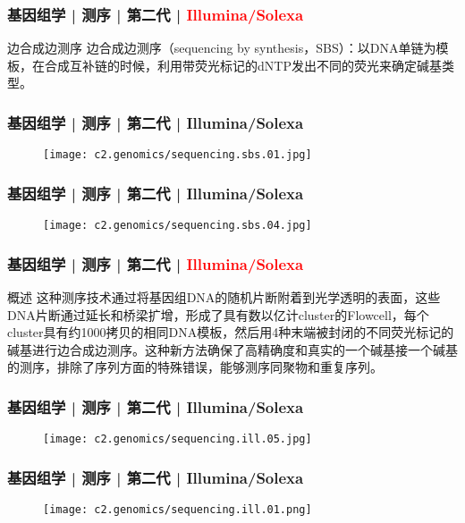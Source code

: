 \begin{frame}
  \frametitle{基因组学 | 测序 | 第二代 | \textcolor{red}{Illumina/Solexa}}
  \begin{block}{边合成边测序}
边合成边测序（sequencing by synthesis，SBS）：以DNA单链为模板，在合成互补链的时候，利用带荧光标记的dNTP发出不同的荧光来确定碱基类型。
  \end{block}
\end{frame}

\begin{frame}
  \frametitle{基因组学 | 测序 | 第二代 | Illumina/Solexa}
  \begin{figure}
    \centering
    \texttt{[image: c2.genomics/sequencing.sbs.01.jpg]}
  \end{figure}
\end{frame}

\begin{frame}
  \frametitle{基因组学 | 测序 | 第二代 | Illumina/Solexa}
  \begin{figure}
    \centering
    \texttt{[image: c2.genomics/sequencing.sbs.04.jpg]}
  \end{figure}
\end{frame}

\begin{frame}
  \frametitle{基因组学 | 测序 | 第二代 | \textcolor{red}{Illumina/Solexa}}
  \begin{block}{概述}
这种测序技术通过将基因组DNA的随机片断附着到光学透明的表面，这些DNA片断通过延长和桥梁扩增，形成了具有数以亿计cluster的Flowcell，每个cluster具有约1000拷贝的相同DNA模板，然后用4种末端被封闭的不同荧光标记的碱基进行边合成边测序。这种新方法确保了高精确度和真实的一个碱基接一个碱基的测序，排除了序列方面的特殊错误，能够测序同聚物和重复序列。
  \end{block}
\end{frame}

\begin{frame}
  \frametitle{基因组学 | 测序 | 第二代 | Illumina/Solexa}
  \begin{figure}
    \centering
    \texttt{[image: c2.genomics/sequencing.ill.05.jpg]}
  \end{figure}
\end{frame}

\begin{frame}
  \frametitle{基因组学 | 测序 | 第二代 | Illumina/Solexa}
  \begin{figure}
    \centering
    \texttt{[image: c2.genomics/sequencing.ill.01.png]}
  \end{figure}
\end{frame}

